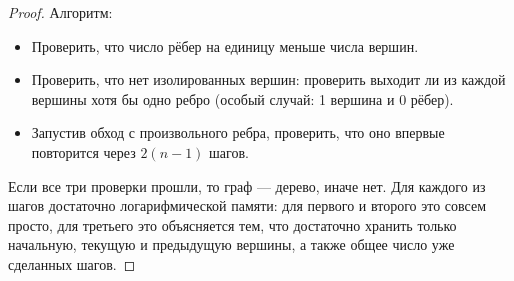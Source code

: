 \begin{proof}
    Алгоритм:
    \begin{itemize}
        \item Проверить, что число рёбер на единицу меньше числа вершин.
        \item Проверить, что нет изолированных вершин: проверить выходит ли из каждой вершины хотя бы одно ребро (особый случай: 1 вершина и 0 рёбер).
        \item Запустив обход с произвольного ребра, проверить, что оно впервые повторится через $2(n - 1)$ шагов.
    \end{itemize}
    
    Если все три проверки прошли, то граф — дерево, иначе нет. Для каждого из шагов достаточно логарифмической памяти: для первого и второго это совсем просто, для третьего это объясняется тем, что достаточно хранить только начальную, текущую и предыдущую вершины, а также общее число уже сделанных шагов.
\end{proof}